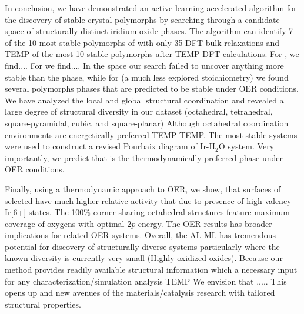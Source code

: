 


%
In conclusion, we have demonstrated an active-learning accelerated algorithm for the discovery of stable crystal polymorphs by searching through a candidate space of structurally distinct iridium-oxide phases.
%
The algorithm can identify \num{7} of the \num{10} most stable polymorphs of \IrOthree with only \num{35} DFT bulk relaxations and TEMP of the most \num{10} stable \IrOtwo polymorphs after TEMP DFT calculations.
%
For \IrOtwo, we find....  For \IrOthree we find....
%
In the \IrOtwo space our search failed to uncover anything more stable than the \rIrOtwo phase,
while for \IrOthree (a much less explored stoichiometry) we found several polymorphs phases that are predicted to be stable under OER conditions.
%
We have analyzed the local and global structural coordination and revealed a large degree of structural diversity in our dataset (octahedral, tetrahedral, square-pyramidal, cubic, and square-planar)
%
Although octahedral coordination environments are energetically preferred TEMP TEMP.
%
The most stable systems were used to construct a revised Pourbaix diagram of Ir-H$_2$O system.
%
Very importantly, we predict that \IrOthree is the thermodynamically preferred phase under OER conditions.


%
Finally, using a thermodynamic approach to OER, we show,
that surfaces of selected \IrOthree have much higher relative activity that \IrOtwo due to presence of high valency Ir[6+] states.
%
The \num{100}\% corner-sharing octahedral structures feature maximum coverage of oxygens with optimal $2p$-energy.
%
The OER results has broader implications for related OER systems.
%
Overall, the AL ML has tremendous potential for discovery of structurally diverse systems particularly where the known diversity is currently very small (Highly oxidized oxides).
%
Because our method provides readily available structural information which a necessary input for any characterization/simulation analysis TEMP We envision that .....
%
This opens up and new avenues of the materials/catalysis research with tailored structural properties.


